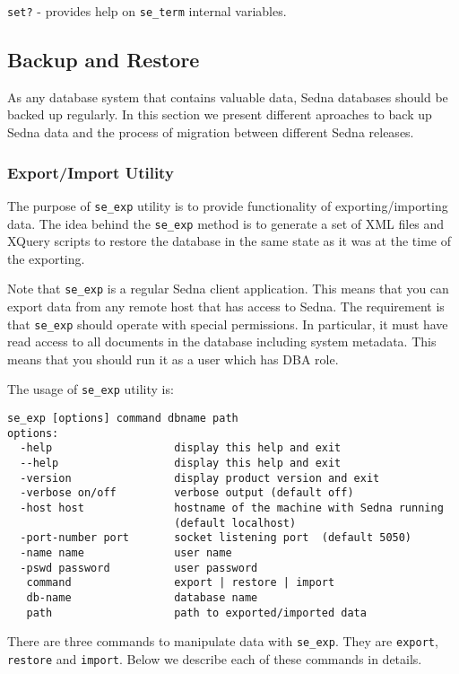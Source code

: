 \documentclass[a4paper,12pt]{article}
\begin{document}
\verb!set?! - provides help on \verb!se_term! internal variables.

\subsection{Backup and Restore}

As any database system that contains valuable data, Sedna databases should be backed up regularly.
In this section we present different aproaches to back up Sedna data and the process of
migration between different Sedna releases.


\subsubsection{Export/Import Utility}

The purpose of \verb!se_exp! utility is to provide functionality of exporting/importing data. The
idea behind the \verb!se_exp! method is to generate a set of XML files and XQuery
scripts to restore the database in the same state as it was at the time of the exporting.

Note that \verb!se_exp! is a regular Sedna client application. This means that you can export data from
any remote host that has access to Sedna. The requirement is that \verb!se_exp! should operate with
special permissions. In particular, it must have read access to all documents in the database including
system metadata. This means that you should run it as a user which has DBA role.

The usage of \verb!se_exp! utility is:

\begin{verbatim}
se_exp [options] command dbname path
options:
  -help                   display this help and exit
  --help                  display this help and exit
  -version                display product version and exit
  -verbose on/off         verbose output (default off)
  -host host              hostname of the machine with Sedna running
                          (default localhost)
  -port-number port       socket listening port  (default 5050)
  -name name              user name
  -pswd password          user password
   command                export | restore | import
   db-name                database name
   path                   path to exported/imported data
\end{verbatim}


There are three commands to manipulate data with \verb!se_exp!. They are \verb!export!,
\verb!restore! and \verb!import!. Below we describe each of these commands in details.
\end{document}
